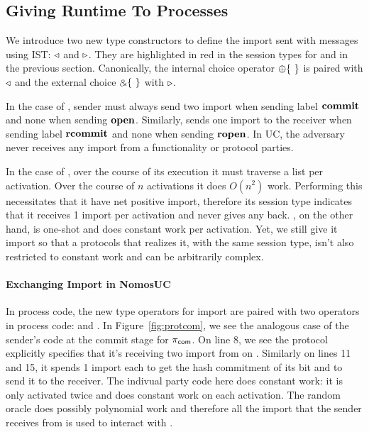 \subsection{Giving Runtime To Processes}
We introduce two new type constructors to define the import sent with messages using IST: $\triangleleft$ and $\triangleright$.
They are highlighted in red in the session types for \Fcom and \Fro in the previous section.
Canonically, the internal choice operator $\ichoice$ is paired with $\triangleleft$ and the external choice $\echoice$ with $\triangleright$.

In the case of \Fcom, sender must always send two import when sending label $\mathbf{commit}$ and none when sending $\mathbf{open}$.
Similarly, \Fcom sends one import to the receiver when sending label $\mathbf{rcommit}$ and none when sending $\mathbf{ropen}$.
In UC, the adversary never receives any import from a functionality or protocol parties.

In the case of \Fro, over the course of its execution it must traverse a list per activation.
Over the course of $n$ activations it does $O(n^2)$ work.
Performing this necessitates that it have net positive import, therefore its session type indicates that it receives 1 import per activation and never gives any back.
\Fcom, on the other hand, is one-shot and does constant work per activation. Yet, we still give it import so that a protocols that realizes it, with the same session type, isn't also restricted to constant work and can be arbitrarily complex.



\paragraph{Exchanging Import in NomosUC}
In process code, the new type operators for import are paired with two operators in process code: \ipay and \iget.
In Figure~\ref{fig:protcom}, we see the analogous case of the sender's code at the commit stage for $\pi_{\mathsf{com}}$. 
On line 8, we see the protocol explicitly specifies that it's receiving two import from \Z on .
Similarly on lines 11 and 15, it spends 1 import each to get the hash commitment of its bit and to send it to the receiver.
The indivual party code here does constant work: it is only activated twice and does constant work on each activation.
The random oracle does possibly polynomial work and therefore all the import that the sender receives from \Z is used to interact with \Fro.


